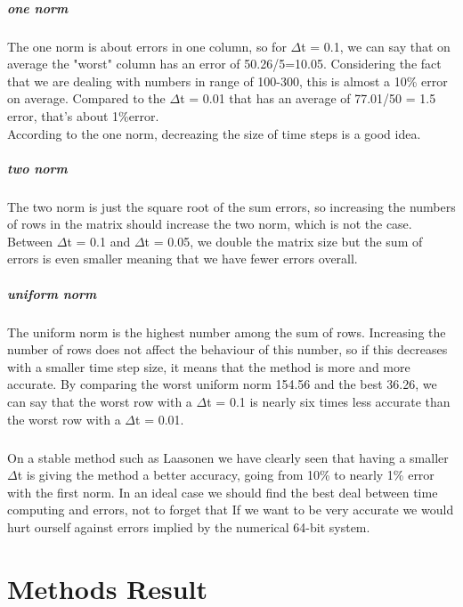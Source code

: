 \documentclass[12pt, a4paper]{report}
\begin{document}
\paragraph{one norm} The one norm is about errors in one column, so for $\Delta$t = 0.1, we can say that on average the "worst" column has an error of 50.26/5=10.05. Considering the fact that we are dealing with numbers in range of 100-300, this is almost a 10\% error on average. Compared to the $\Delta$t = 0.01 that has an average of 77.01/50 = 1.5 error, that's about 1\%error.\\
According to the one norm, decreazing the size of time steps is a good idea.

\paragraph{two norm} The two norm is just the square root of the sum errors, so increasing the numbers of rows in the matrix should increase the two norm, which is not the case. Between $\Delta$t = 0.1 and $\Delta$t = 0.05, we double the matrix size but the sum of errors is even smaller meaning that we have fewer errors overall.

\paragraph{uniform norm} The uniform norm is the highest number among the sum of rows. Increasing the number of rows does not affect the behaviour of this number, so if this decreases with a smaller time step size, it means that the method is more and more accurate. By comparing the worst uniform norm 154.56 and the best 36.26,  we can say that the worst row with a $\Delta$t = 0.1 is nearly six times less accurate than the worst row with a $\Delta$t = 0.01.

\paragraph{} On a stable method such as Laasonen we have clearly seen that having a smaller $\Delta$t is giving the method a better accuracy, going from 10\% to nearly 1\% error with the first norm. In an ideal case we should find the best deal between time computing and errors, not to forget that If we want to be very accurate we would hurt ourself against errors implied by the numerical 64-bit system.

\chapter{Methods Result}
\end{document}
